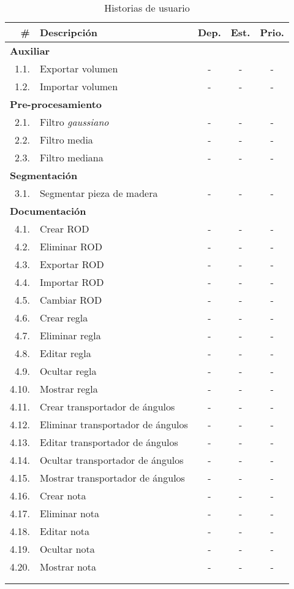 \begin{longtable} {r l c c c}
	\hline
	\#	&	\textbf{Descripción}					&	\textbf{Dep.}	&	\textbf{Est.}	&	\textbf{Prio.}	\\
	\hline \hline
	\endhead
	\multicolumn{5}{l}{\textbf{Auxiliar}} \\
	\hline 
	1.1.	&	Exportar volumen					&	-				&	-				&	-	\\
	\hline
	1.2.	&	Importar volumen					&	-				&	-				&	-	\\
	\hline
	\multicolumn{5}{l}{\textbf{Pre-procesamiento}} \\
	\hline 
	2.1.	&	Filtro \textit{gaussiano}			&	-				&	-				&	-	\\
	\hline
	2.2.	&	Filtro media						&	-				&	-				&	-	\\
	\hline
	2.3.	&	Filtro mediana						&	-				&	-				&	-	\\
	\hline
	\multicolumn{5}{l}{\textbf{Segmentación}} \\
	\hline 
	3.1.	&	Segmentar pieza de madera			&	-				&	-				&	-	\\
	\hline
	\multicolumn{5}{l}{\textbf{Documentación}} \\
	\hline 
	4.1.	&	Crear ROD							&	-				&	-				&	-	\\
	\hline
	4.2.	&	Eliminar ROD						&	-				&	-				&	-	\\
	\hline
	4.3.	&	Exportar ROD						&	-				&	-				&	-	\\
	\hline
	4.4.	&	Importar ROD						&	-				&	-				&	-	\\
	\hline
	4.5.	&	Cambiar ROD							&	-				&	-				&	-	\\
	\hline
	4.6.	&	Crear regla							&	-				&	-				&	-	\\
	\hline
	4.7.	&	Eliminar regla						&	-				&	-				&	-	\\
	\hline
	4.8.	&	Editar regla						&	-				&	-				&	-	\\
	\hline
	4.9.	&	Ocultar regla						&	-				&	-				&	-	\\
	\hline
	4.10.	&	Mostrar regla						&	-				&	-				&	-	\\
	\hline
	4.11.	&	Crear transportador de ángulos		&	-				&	-				&	-	\\
	\hline
	4.12.	&	Eliminar transportador de ángulos	&	-				&	-				&	-	\\
	\hline
	4.13.	&	Editar transportador de ángulos		&	-				&	-				&	-	\\
	\hline
	4.14.	&	Ocultar transportador de ángulos	&	-				&	-				&	-	\\
	\hline
	4.15.	&	Mostrar transportador de ángulos	&	-				&	-				&	-	\\
	\hline
	4.16.	&	Crear nota							&	-				&	-				&	-	\\
	\hline
	4.17.	&	Eliminar nota						&	-				&	-				&	-	\\
	\hline
	4.18.	&	Editar nota							&	-				&	-				&	-	\\
	\hline
	4.19.	&	Ocultar nota						&	-				&	-				&	-	\\
	\hline
	4.20.	&	Mostrar nota						&	-				&	-				&	-	\\
	\hline
	\\
	\caption{Historias de usuario}
	\label{tab:hus}
\end{longtable}